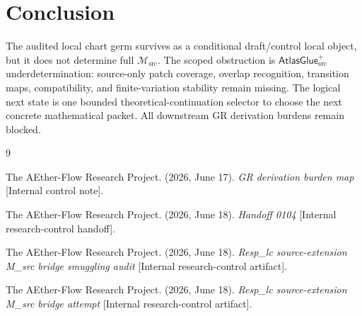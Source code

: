 \documentclass[11pt]{article}
\newcommand{\Msrc}{\mathcal{M}_{\mathrm{src}}}
\newcommand{\AtlasGlue}{\mathsf{AtlasGlue}_{\mathrm{src}}^{+}}
\begin{document}
\section{Conclusion}

The audited local chart germ survives as a conditional draft/control local
object, but it does not determine full \(\Msrc\). The scoped obstruction is
\(\AtlasGlue\) underdetermination: source-only patch coverage, overlap
recognition, transition maps, compatibility, and finite-variation stability
remain missing. The logical next state is one bounded
theoretical-continuation selector to choose the next concrete mathematical
packet. All downstream GR derivation burdens remain blocked.

\begin{thebibliography}{9}

The AEther-Flow Research Project. (2026, June 17). \emph{GR derivation burden
map} [Internal control note].

The AEther-Flow Research Project. (2026, June 18). \emph{Handoff 0104}
[Internal research-control handoff].

The AEther-Flow Research Project. (2026, June 18). \emph{Resp\_lc
source-extension M\_src bridge smuggling audit} [Internal research-control
artifact].

The AEther-Flow Research Project. (2026, June 18). \emph{Resp\_lc
source-extension M\_src bridge attempt} [Internal research-control artifact].

\end{thebibliography}
\end{document}

